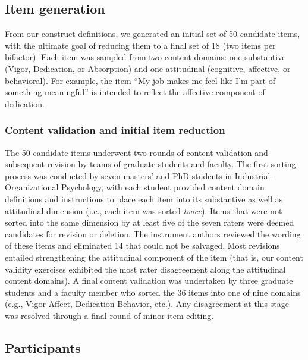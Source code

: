 \documentclass[
  english,
  man]{apa7}
\begin{document}
\hypertarget{item-generation}{%
\subsection{Item generation}\label{item-generation}}

From our construct definitions, we generated an initial set of 50 candidate items, with the ultimate goal of reducing them to a final set of 18 (two items per bifactor). Each item was sampled from two content domains: one substantive (Vigor, Dedication, or Absorption) and one attitudinal (cognitive, affective, or behavioral). For example, the item ``My job makes me feel like I'm part of something meaningful'' is intended to reflect the affective component of dedication.

\hypertarget{content-validation-and-initial-item-reduction}{%
\subsubsection{Content validation and initial item reduction}\label{content-validation-and-initial-item-reduction}}

The 50 candidate items underwent two rounds of content validation and subsequent revision by teams of graduate students and faculty. The first sorting process was conducted by seven masters' and PhD students in Industrial-Organizational Psychology, with each student provided content domain definitions and instructions to place each item into its substantive as well as attitudinal dimension (i.e., each item was sorted \emph{twice}). Items that were not sorted into the same dimension by at least five of the seven raters were deemed candidates for revision or deletion. The instrument authors reviewed the wording of these items and eliminated 14 that could not be salvaged. Most revisions entailed strengthening the attitudinal component of the item (that is, our content validity exercises exhibited the most rater disagreement along the attitudinal content domains). A final content validation was undertaken by three graduate students and a faculty member who sorted the 36 items into one of nine domains (e.g., Vigor-Affect, Dedication-Behavior, etc.). Any disagreement at this stage was resolved through a final round of minor item editing.

\hypertarget{participants}{%
\subsection{Participants}\label{participants}}
\end{document}
